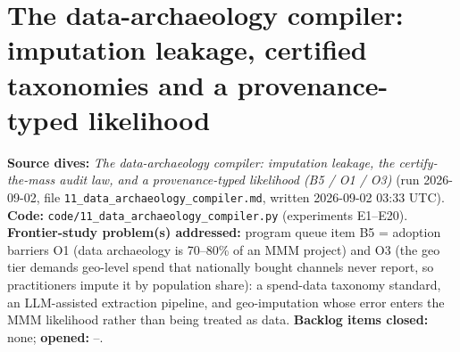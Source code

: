 \chapter[The data-archaeology compiler]{The data-archaeology compiler: imputation leakage, certified taxonomies and a provenance-typed likelihood}
\label{ch:archaeology}

\begin{provenance}
\textbf{Source dives:}  \emph{The data-archaeology compiler: imputation leakage, the certify-the-mass audit law, and a provenance-typed likelihood (B5 / O1 / O3)} (run 2026-09-02, file \texttt{11\_data\_archaeology\_compiler.md}, written 2026-09-02 03:33 UTC).
\textbf{Code:} \texttt{code/11\_data\_archaeology\_compiler.py} (experiments E1--E20).
\textbf{Frontier-study problem(s) addressed:} program queue item B5 = adoption barriers O1 (data archaeology is 70--80\% of an MMM project) and O3 (the geo tier demands geo-level spend that nationally bought channels never report, so practitioners impute it by population share): a spend-data taxonomy standard, an LLM-assisted extraction pipeline, and geo-imputation whose error enters the MMM likelihood rather than being treated as data.
\textbf{Backlog items closed:} none; \textbf{opened:} --.
\end{provenance}

